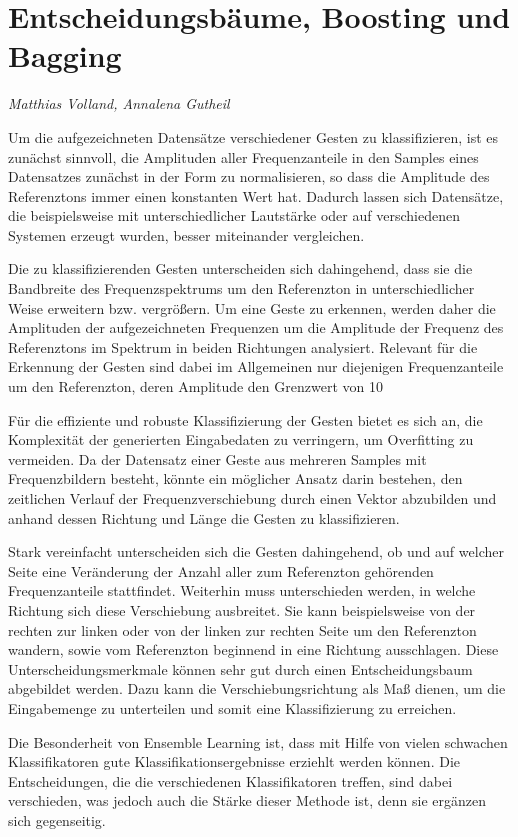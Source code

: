 \section{Entscheidungsbäume, Boosting und Bagging}
\textit{Matthias Volland, Annalena Gutheil}



Um die aufgezeichneten Datensätze verschiedener Gesten zu klassifizieren, ist es zunächst sinnvoll, die Amplituden aller Frequenzanteile in den Samples eines Datensatzes zunächst in der Form zu normalisieren, so dass die Amplitude des Referenztons immer einen konstanten Wert hat. Dadurch lassen sich Datensätze, die beispielsweise mit unterschiedlicher Lautstärke oder auf verschiedenen Systemen erzeugt wurden, besser miteinander vergleichen.

Die zu klassifizierenden Gesten unterscheiden sich dahingehend, dass sie die Bandbreite des Frequenzspektrums um den Referenzton in unterschiedlicher Weise erweitern bzw. vergrößern. Um eine Geste zu erkennen, werden daher die Amplituden der aufgezeichneten Frequenzen um die Amplitude der Frequenz des Referenztons im Spektrum in beiden Richtungen analysiert. Relevant für die Erkennung der Gesten sind dabei im Allgemeinen nur diejenigen Frequenzanteile um den Referenzton, deren Amplitude den Grenzwert von 10%

Für die effiziente und robuste Klassifizierung der Gesten bietet es sich an, die Komplexität der generierten Eingabedaten zu verringern, um Overfitting zu vermeiden. Da der Datensatz einer Geste aus mehreren Samples mit Frequenzbildern besteht, könnte ein möglicher Ansatz darin bestehen, den zeitlichen Verlauf der Frequenzverschiebung durch einen Vektor abzubilden und anhand dessen Richtung und Länge die Gesten zu klassifizieren.

Stark vereinfacht unterscheiden sich die Gesten dahingehend, ob und auf welcher Seite eine Veränderung der Anzahl aller zum Referenzton gehörenden Frequenzanteile stattfindet. Weiterhin muss unterschieden werden, in welche Richtung sich diese Verschiebung ausbreitet. Sie kann beispielsweise von der rechten zur linken oder von der linken zur rechten Seite um den Referenzton wandern, sowie vom Referenzton beginnend in eine Richtung ausschlagen. Diese Unterscheidungsmerkmale können sehr gut durch einen Entscheidungsbaum abgebildet werden. Dazu kann die Verschiebungsrichtung als Maß dienen, um die Eingabemenge zu unterteilen und somit eine Klassifizierung zu erreichen.

Die Besonderheit von Ensemble Learning ist, dass mit Hilfe von vielen schwachen Klassifikatoren gute Klassifikationsergebnisse erziehlt werden können. Die Entscheidungen, die die verschiedenen Klassifikatoren treffen, sind dabei verschieden, was jedoch auch die Stärke dieser Methode ist, denn sie ergänzen sich gegenseitig.